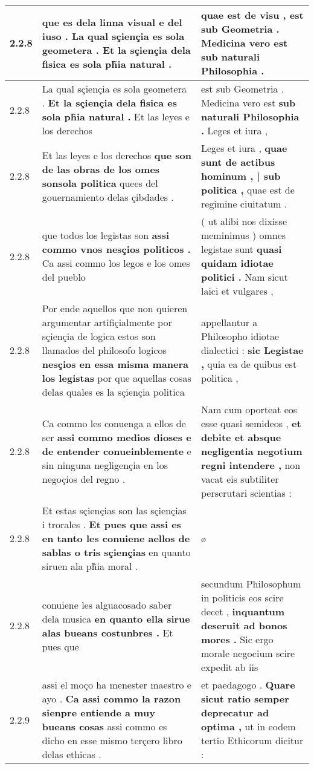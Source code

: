 \begin{tabular}{|p{1cm}|p{6.5cm}|p{6.5cm}|}
2.2.8 & que es dela linna visual e del iuso . \textbf{ La qual sçiençia es sola geometera . } Et la sçiençia dela fisica es sola ph̃ia natural . & quae est de visu , \textbf{ est sub Geometria . Medicina vero est } sub naturali Philosophia . \\\hline
2.2.8 & La qual sçiençia es sola geometera . \textbf{ Et la sçiençia dela fisica es sola ph̃ia natural . } Et las leyes e los derechos & est sub Geometria . Medicina vero est \textbf{ sub naturali Philosophia . } Leges et iura , \\\hline
2.2.8 & Et las leyes e los derechos \textbf{ que son de las obras de los omes sonsola politica } quees del gouernamiento delas çibdades . & Leges et iura , \textbf{ quae sunt de actibus hominum , | sub politica , } quae est de regimine ciuitatum . \\\hline
2.2.8 & que todos los legistas son \textbf{ assi commo vnos nesçios politicos . } Ca assi commo los legos e los omes del pueblo & ( ut alibi nos dixisse meminimus ) omnes legistae sunt \textbf{ quasi quidam idiotae politici . } Nam sicut laici et vulgares , \\\hline
2.2.8 & Por ende aquellos que non quieren argumentar artifiçialmente por sçiençia de logica estos son llamados del philosofo logicos \textbf{ nesçios en essa misma manera los legistas } por que aquellas cosas delas quales es la sçiençia politica & appellantur a Philosopho idiotae dialectici : \textbf{ sic Legistae , } quia ea de quibus est politica , \\\hline
2.2.8 & Ca commo les conuenga a ellos de ser \textbf{ assi commo medios dioses e de entender conueinblemente } e sin ninguna negligençia en los negoçios del regno . & Nam cum oporteat eos esse quasi semideos , \textbf{ et debite et absque negligentia negotium regni intendere , } non vacat eis subtiliter perscrutari scientias : \\\hline
2.2.8 & Et estas sçiençias son las sçiençias i trorales . \textbf{ Et pues que assi es en tanto les conuiene aellos de sablas o tris sçiençias } en quanto siruen ala ph̃ia moral . & ø \\\hline
2.2.8 & conuiene les alguacosado saber dela musica \textbf{ en quanto ella sirue alas bueans costunbres . } Et pues que & secundum Philosophum in politicis eos scire decet , \textbf{ inquantum deseruit ad bonos mores . } Sic ergo morale negocium scire expedit ab iis \\\hline
2.2.9 & assi el moço ha menester maestro e ayo . \textbf{ Ca assi commo la razon sienpre entiende a muy bueans cosas } assi commo es dicho en esse mismo terçero libro delas ethicas . & et paedagogo . \textbf{ Quare sicut ratio semper deprecatur ad optima , } ut in eodem tertio Ethicorum dicitur : \\\hline

\end{tabular}
